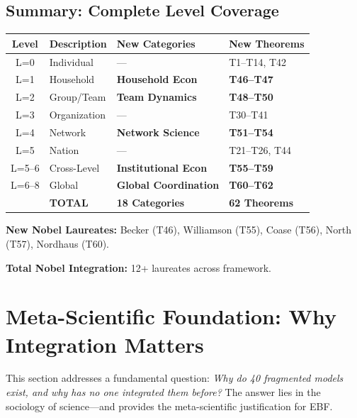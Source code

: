 \subsection{Summary: Complete Level Coverage}

\begin{tcolorbox}[colback=green!5!white, colframe=green!75!black,
    title=BCJ Now Covers All Levels L=0 to L=8]
\begin{center}
\begin{tabular}{clll}
\toprule
\textbf{Level} & \textbf{Description} & \textbf{New Categories} & \textbf{New Theorems} \\
\midrule
L=0 & Individual & --- & T1--T14, T42 \\
L=1 & Household & \textbf{Household Econ} & \textbf{T46--T47} \\
L=2 & Group/Team & \textbf{Team Dynamics} & \textbf{T48--T50} \\
L=3 & Organization & --- & T30--T41 \\
L=4 & Network & \textbf{Network Science} & \textbf{T51--T54} \\
L=5 & Nation & --- & T21--T26, T44 \\
L=5--6 & Cross-Level & \textbf{Institutional Econ} & \textbf{T55--T59} \\
L=6--8 & Global & \textbf{Global Coordination} & \textbf{T60--T62} \\
\midrule
& \textbf{TOTAL} & \textbf{18 Categories} & \textbf{62 Theorems} \\
\bottomrule
\end{tabular}
\end{center}

\textbf{New Nobel Laureates:} Becker (T46), Williamson (T55), Coase (T56), North (T57), Nordhaus (T60).

\textbf{Total Nobel Integration:} 12+ laureates across framework.
\end{tcolorbox}



\section{Meta-Scientific Foundation: Why Integration Matters}
\label{sec:bcj-metascience}

This section addresses a fundamental question: \textit{Why do 40 fragmented models exist, and why has no one integrated them before?} The answer lies in the sociology of science---and provides the meta-scientific justification for EBF.

